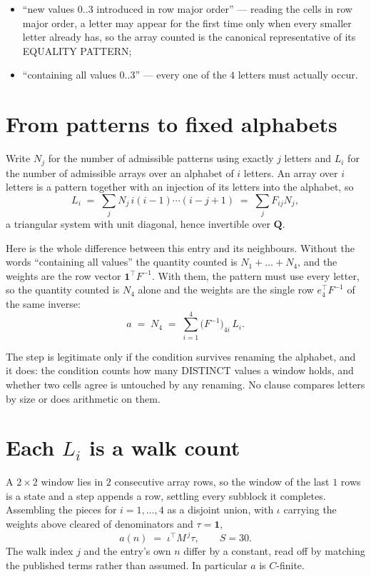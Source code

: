 \documentclass[11pt,a4paper]{article}
\theoremstyle{plain}
\theoremstyle{definition}
\begin{document}
\begin{itemize}
\item ``new values $0..3$ introduced in row major order'' --- reading the cells in row major
order, a letter may appear for the first time only when every smaller letter already has, so
the array counted is the canonical representative of its EQUALITY PATTERN;
\item ``containing all values $0..3$'' --- every one of the $4$ letters must actually
occur.
\end{itemize}


\section{From patterns to fixed alphabets}

Write $N_j$ for the number of admissible patterns using exactly $j$ letters and $L_i$ for the
number of admissible arrays over an alphabet of $i$ letters. An array over $i$ letters is a
pattern together with an injection of its letters into the alphabet, so
\[
L_i\;=\;\sum_{j} N_j\,i(i-1)\cdots(i-j+1)\;=\;\sum_j F_{ij}N_j ,
\]
a triangular system with unit diagonal, hence invertible over $\mathbf{Q}$.

Here is the whole difference between this entry and its neighbours. Without the words
``containing all values'' the quantity counted is $N_1+\dots+N_{4}$, and the weights are
the row vector $\mathbf{1}^{\!\top}F^{-1}$. With them, the pattern must use every letter,
so the quantity counted is $N_{4}$ alone and the weights are the single row
$e_{4}^{\!\top}F^{-1}$ of the same inverse:
\[
a\;=\;N_{4}\;=\;\sum_{i=1}^{4}\bigl(F^{-1}\bigr)_{4i}\,L_i .
\]

The step is legitimate only if the condition survives renaming the alphabet, and it does: the
condition counts how many DISTINCT values a window holds, and whether two cells agree is
untouched by any renaming. No clause compares letters by size or does arithmetic on them.

\section{Each $L_i$ is a walk count}

A $2\times2$ window lies in $2$ consecutive array rows, so the window of the last
$1$ rows is a state and a step appends a row, settling every subblock it completes.
Assembling the pieces for $i=1,\dots,4$ as a disjoint union, with $\iota$ carrying the
weights above cleared of denominators and $\tau=\mathbf{1}$,
\[
a(n)\;=\;\iota^{\!\top}M^{\,j}\tau ,\qquad S=30.
\]
The walk index $j$ and the entry's own $n$ differ by a constant, read off by matching the
published terms rather than assumed. In particular $a$ is $C$-finite.
\end{document}
